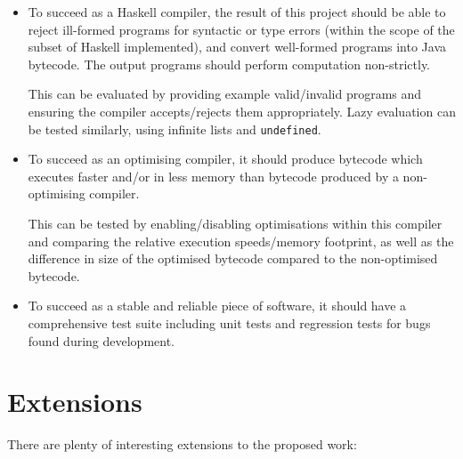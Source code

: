 \documentclass[12pt]{article}
\newcommand\haskell[1]{\texttt{#1}}
\begin{document}
\begin{itemize}
\item
{
    To succeed as a Haskell compiler, the result of this project should be able to reject ill-formed programs for
    syntactic or type errors (within the scope of the subset of Haskell implemented), and convert well-formed programs
    into Java bytecode. The output programs should perform computation non-strictly.

    This can be evaluated by providing example valid/invalid programs and ensuring the compiler accepts/rejects them
    appropriately. Lazy evaluation can be tested similarly, using infinite lists and \haskell{undefined}.
}
\item
{
    To succeed as an optimising compiler, it should produce bytecode which executes faster and/or in less memory than
    bytecode produced by a non-optimising compiler.
    
    This can be tested by enabling/disabling optimisations within this compiler and comparing the relative execution
    speeds/memory footprint, as well as the difference in size of the optimised bytecode compared to the non-optimised bytecode.
}
\item
{
    To succeed as a stable and reliable piece of software, it should have a comprehensive test suite including unit
    tests and regression tests for bugs found during development.
}
\end{itemize}


\section*{Extensions}

There are plenty of interesting extensions to the proposed work:
\end{document}
